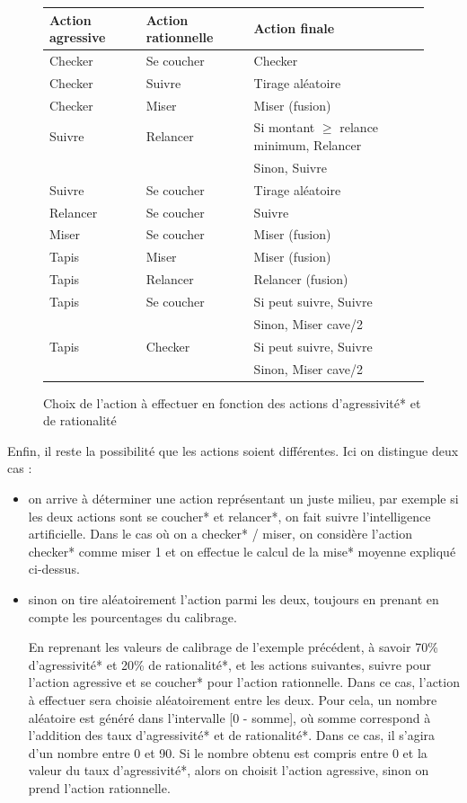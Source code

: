 \documentclass{report}
\begin{document}
\begin{figure}[H]
\begin{center}
\begin{tabular}{|l|l|l|}
	\hline
	Action agressive		&	Action rationnelle 	&	Action finale\\
	\hline
	Checker		&	Se coucher	&	Checker\\
	\hline
	Checker		&	Suivre		&	Tirage aléatoire\\
	\hline
	Checker		&	Miser		&	Miser (fusion)\\
	\hline
	Suivre		&	Relancer		&	Si montant $\geq$ relance minimum, Relancer\\
				&				&		Sinon, Suivre\\
	\hline
	Suivre		&	Se coucher	&	Tirage aléatoire\\
	\hline
	Relancer		&	Se coucher	&	Suivre\\
	\hline
	Miser		&	Se coucher	&	Miser (fusion)\\
	\hline
	Tapis		&	Miser		&	Miser (fusion)\\
	\hline
	Tapis		&	Relancer		&	Relancer (fusion)\\
	\hline
	Tapis		&	Se coucher	&	Si peut suivre, Suivre\\
				&				&	Sinon, Miser cave/2\\
	\hline
	Tapis		&	Checker		&	Si peut suivre, Suivre\\
				&				&   Sinon, Miser cave/2\\
	\hline
\end{tabular}
\end{center}
\caption{Choix de l'action à effectuer en fonction des actions d'agressivité* et de rationalité}
\end{figure}

Enfin, il reste la possibilité que les actions soient différentes. Ici on distingue deux cas :
\begin{itemize}
\renewcommand{\labelitemi}{-}
\item on arrive à déterminer une action représentant un juste milieu, par exemple si les deux actions sont se coucher* et relancer*, on fait suivre l'intelligence artificielle. Dans le cas où on a checker* / miser, on considère l'action checker* comme miser 1 et on effectue le calcul de la mise* moyenne expliqué ci-dessus.
\item sinon on tire aléatoirement l'action parmi les deux, toujours en prenant en compte les pourcentages du calibrage. 

En reprenant les valeurs de calibrage de l'exemple précédent, à savoir 70\% d'agressivité* et 20\% de rationalité*, et les actions suivantes, suivre pour l'action agressive et se coucher* pour l'action rationnelle. Dans ce cas, l'action à effectuer sera choisie aléatoirement entre les deux. Pour cela, un nombre aléatoire est généré dans l'intervalle [0 - somme], où somme correspond à l'addition des taux d'agressivité* et de rationalité*. Dans ce cas, il s'agira d'un nombre entre 0 et 90. Si le nombre obtenu est compris entre 0 et la valeur du taux d'agressivité*, alors on choisit l'action agressive, sinon on prend l'action rationnelle.\\


\end{itemize}
\end{document}
